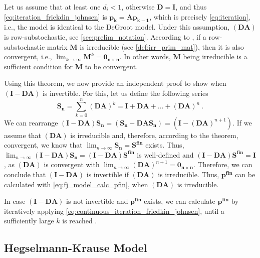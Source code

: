 \documentclass[journal,compsoc,10pt]{IEEEtran}
\renewcommand{\vec}[1]{\bm{#1}}        %
\newcommand{\mat}[1]{\bm{#1}}          %
\newcommand{\zerosmatr}{\bm{0_{n\times n}}}
\newcommand{\eye}{\bm{I}}              %
\begin{document}
Let us assume that at least one $d_i<1$, otherwise $\mat D = \eye$, and thus \cref{eq:iteration_friekdin_johnsen} is $\vec{p_k} = \mat A\vec{p_{k-1}}$, which is precisely \cref{eq:iteration}, i.e., the model is identical to the DeGroot model. Under this assumption, $(\mat D \mat A)$ is row-substochastic, see \cref{sec:prelim_notation}. According to \cite{Bullo_lecture}, if a row-substochastic matrix $\mat M$ is irreducible (see \cref{def:irr_prim_mat}), then it is also convergent, i.e., $\lim_{k\rightarrow\infty}\mat{M}^k = \zerosmatr$. In other words, $\mat M$ being irreducible is a sufficient condition for $\mat M$ to be convergent. 

Using this theorem, we now provide an independent proof to show when $(\eye-\mat D \mat A)$ is invertible. For this, let us define the following series
\[\mat{S_n} = \sum_{k=0}^n(\mat D\mat A)^k= \eye + \mat D\mat A + \dots + (\mat D\mat A)^n\ .\]
We can rearrange $(\eye -\mat D\mat A)\mat{S_n} = (\mat{S_n} - \mat D\mat A\mat{S_n}) = (\eye - (\mat D\mat A)^{n+1})$. 
If we assume that $(\mat D\mat A)$ is irreducible and, therefore, according to the theorem, convergent, we know that $\lim_{n\rightarrow\infty}\mat{S_n} = \mat{S^{fin}}$ exists. Thus, $\lim_{n\rightarrow\infty}(\eye -\mat D\mat A)\mat{S_n} = (\eye -\mat D\mat A)\mat{S^{fin}}$ is well-defined and $(\eye -\mat D\mat A)\mat{S^{fin}} = \eye$, as $(\mat D\mat A)$ is convergent with $\lim_{n\rightarrow\infty}(\mat D\mat A)^{n+1} = \zerosmatr$. Therefore, we can conclude that $(\eye -\mat D \mat A)$ is invertible if $(\mat D\mat A)$ is irreducible. Thus, $\vec{p^{fin}}$ can be calculated with \cref{eq:fj_model_calc_pfin}, when $(\mat D\mat A)$ is irreducible.

In case $(\eye -\mat D \mat A)$ is not invertible and $\vec{p^{fin}}$ exists, we can calculate $\vec{p^{fin}}$ by iteratively applying \cref{eq:continuous_iteration_friedkin_johnsen}, until a sufficiently large $k$ is reached \cite{article}.

\subsection{Hegselmann-Krause Model}\label{sec:bounded_conf}
\end{document}
